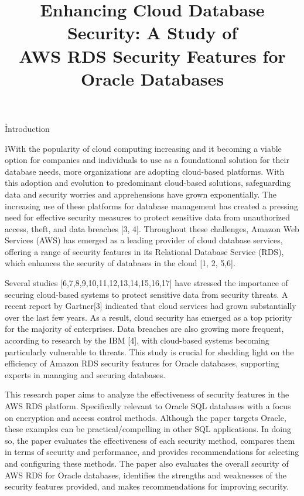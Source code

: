 \documentclass{ieee}
\title    {Enhancing Cloud Database Security: A Study of \\
           AWS RDS Security Features for Oracle Databases}
\begin{document}
\toc 

\h{Introduction}

\l{W}ith the popularity of cloud computing increasing and it becoming a viable option for companies and individuals to use as a foundational solution for their database needs, more organizations are adopting cloud-based platforms. With this adoption and evolution to predominant cloud-based solutions, safeguarding data and security worries and apprehensions have grown exponentially. The increasing use of these platforms for database management has created a pressing need for effective security measures to protect sensitive data from unauthorized access, theft, and data breaches [3, 4]. Throughout these challenges, Amazon Web Services (AWS) has emerged as a leading provider of cloud database services, offering a range of security features in its Relational Database Service (RDS), which enhances the security of databases in the cloud [1, 2, 5,6].

Several studies [6,7,8,9,10,11,12,13,14,15,16,17] have stressed the importance of securing cloud-based systems to protect sensitive data from security threats. A recent report by Gartner[3] indicated that cloud services had grown substantially over the last few years. As a result, cloud security has emerged as a top priority for the majority of enterprises. Data breaches are also growing more frequent, according to research by the IBM [4], with cloud-based systems becoming particularly vulnerable to threats. This study is crucial for shedding light on the efficiency of Amazon RDS security features for Oracle databases, supporting experts in managing and securing databases.

This research paper aims to analyze the effectiveness of security features in the AWS RDS platform. Specifically relevant to Oracle SQL databases with a focus on encryption and access control methods. Although the paper targets Oracle, these examples can be practical/compelling in other SQL applications. In doing so, the paper evaluates the effectiveness of each security method, compares them in terms of security and performance, and provides recommendations for selecting and configuring these methods. The paper also evaluates the overall security of AWS RDS for Oracle databases, identifies the strengths and weaknesses of the security features provided, and makes recommendations for improving security.
\end{document}
